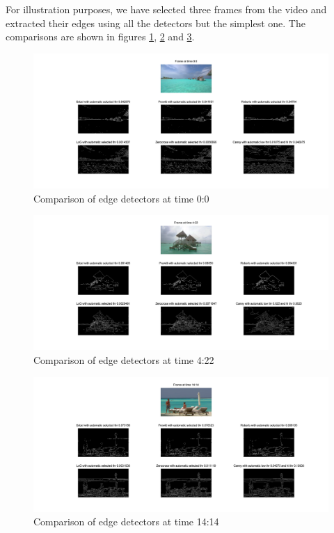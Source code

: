 For illustration purposes, we have selected three frames from the video and extracted their
edges using all the detectors but the simplest one. The comparisons are shown in figures
\ref{fig:firstcomparison}, \ref{fig:secondcomparison} and \ref{fig:thirdcomparison}.

\begin{figure}[!hbt]
  \includegraphics[width=\textwidth]{./img/ex2/comparison_0_0.png}
  \caption{Comparison of edge detectors at time 0:0}
  \label{fig:firstcomparison}
\end{figure}

\begin{figure}[!hbt]
  \includegraphics[width=\textwidth]{./img/ex2/comparison_4_22.png}
  \caption{Comparison of edge detectors at time 4:22}
  \label{fig:secondcomparison}
\end{figure}

\begin{figure}[!hbt]
  \includegraphics[width=\textwidth]{./img/ex2/comparison_14_14.png}
  \caption{Comparison of edge detectors at time 14:14}
  \label{fig:thirdcomparison}
\end{figure}

